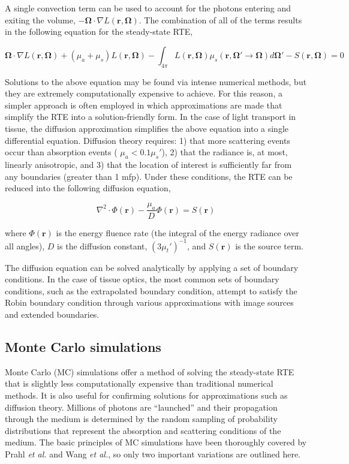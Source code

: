 \noindent A single convection term can be used to account for the photons entering and exiting the volume, $-\mathbf{\Omega}\cdot\nabla L(\mathbf{r},\mathbf{\Omega})$. The combination of all of the terms results in the following equation for the steady-state RTE,\cite{Farrell2003}

\begin{equation}
\label{eq:rte}
\mathbf{\Omega}\cdot\nabla L(\mathbf{r},\mathbf{\Omega}) + (\mu_a + \mu_s) L(\mathbf{r},\mathbf{\Omega}) - \int_{4\pi} L(\mathbf{r},\mathbf{\Omega}) \mu_s(\mathbf{r},\mathbf{\Omega}' \rightarrow \mathbf{\Omega}) d \mathbf{\Omega'} - S(\mathbf{r},\mathbf{\Omega}) = 0
\end{equation}

Solutions to the above equation may be found via intense numerical methods, but they are extremely computationally expensive to achieve. For this reason, a simpler approach is often employed in which approximations are made that simplify the RTE into a solution-friendly form. In the case of light transport in tissue, the diffusion approximation simplifies the above equation into a single differential equation. Diffusion theory requires: 1) that more scattering events occur than absorption events ( $ \mu_a < 0.1\mu_s'$), 2) that the radiance is, at most, linearly anisotropic, and 3) that the location of interest is sufficiently far from any boundaries (greater than 1 mfp).\cite{Jacques2004,Wilson2008} Under these conditions, the RTE can be reduced into the following diffusion equation,

\begin{equation}
\label{eq:diffeq}
\nabla^2 \cdot \Phi(\mathbf{r}) - \frac{\mu_a}{D}\Phi(\mathbf{r}) = S(\mathbf{r})
\end{equation}

where $\Phi(\mathbf{r})$ is the energy fluence rate (the integral of the energy radiance over all angles), $D$ is the diffusion constant, $(3\mu_t')^{-1}$, and $S(\mathbf{r})$ is the source term.

The diffusion equation can be solved analytically by applying a set of boundary conditions. In the case of tissue optics, the most common sets of boundary conditions, such as the extrapolated boundary condition, attempt to satisfy the Robin boundary condition through various approximations with image sources and extended boundaries.\cite{Prahl1995}

\subsection{Monte Carlo simulations}
\label{sec:mc}
Monte Carlo (MC) simulations offer a method of solving the steady-state RTE that is slightly less computationally expensive than traditional numerical methods. It is also useful for confirming solutions for approximations such as diffusion theory. Millions of photons are ``launched'' and their propagation through the medium is determined by the random sampling of probability distributions that represent the absorption and scattering conditions of the medium. The basic principles of MC simulations have been thoroughly covered by Prahl \emph{et al.}\cite{Prahl1989} and Wang \emph{et al.},\cite{Wang1995} so only two important variations are outlined here.

